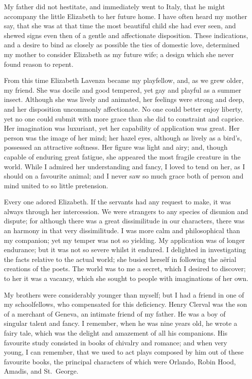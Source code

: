 My father did not hestitate, and immediately
went to Italy, that he might
accompany the little Elizabeth to her
future home. I have often heard my
mother say, that she was at that time the
most beautiful child she had ever seen,
and shewed signs even then of a gentle
and affectionate disposition. These
indications, and a desire to bind as
closely as possible the ties of domestic
love, determined my mother to consider
Elizabeth as my future wife; a design
which she never found reason to repent.

From this time Elizabeth Lavenza
became my playfellow, and, as we grew
older, my friend. She was docile and
good tempered, yet gay and playful as
a summer insect. Although she was
lively and animated, her feelings were
strong and deep, and her disposition
uncommonly affectionate. No one
could better enjoy liberty, yet no one
could submit with more grace than she
did to constraint and caprice. Her
imagination was luxuriant, yet her capability
of application was great. Her
person was the image of her mind; her
hazel eyes, although as lively as a
bird's, possessed an attractive softness.
Her figure was light and airy; and,
though capable of enduring great fatigue,
she appeared the most fragile
creature in the world. While I admired
her understanding and fancy, I
loved to tend on her, as I should on a
favourite animal; and I never saw so
much grace both of person and mind
united to so little pretension.

Every one adored Elizabeth. If the
servants had any request to make, it was
always through her intercession. We
were strangers to any species of disunion
and dispute; for although there
was a great dissimilitude in our characters,
there was an harmony in that
very dissimilitude. I was more calm
and philosophical than my companion;
yet my temper was not so yielding.
My application was of longer endurance;
but it was not so severe whilst it
endured. I delighted in investigating
the facts relative to the actual world;
she busied herself in following the
aërial creations of the poets. The world
was to me a secret, which I desired to
discover; to her it was a vacancy,
which she sought to people with imaginations
of her own.

My brothers were considerably younger
than myself; but I had a friend in
one of my schoolfellows, who compensated
for this deficiency. Henry Clerval
was the son of a merchant of Geneva,
an intimate friend of my father.
He was a boy of singular talent and
fancy. I remember, when he was nine
years old, he wrote a fairy tale, which
was the delight and amazement of all
his companions. His favourite study
consisted in books of chivalry and romance;
and when very young, I can
remember, that we used to act plays
composed by him out of these favourite
books, the principal characters of
which were Orlando, Robin Hood,
Amadis, and St.~George.

